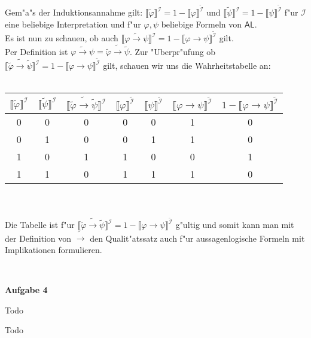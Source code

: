 \documentclass[a4paper,10pt]{article}
\begin{document}
\begin{compactenum} [(a)]
		Gem"a"s der Induktionsannahme gilt: $\llbracket \tilde{\varphi} \rrbracket^\mathcal{I} = 1 - \llbracket \varphi \rrbracket^{\tilde{\mathcal{I}}}$ und $\llbracket \tilde{\psi} \rrbracket^\mathcal{I} = 1 - \llbracket \psi \rrbracket^{\tilde{\mathcal{I}}}$ f"ur $\mathcal{I}$ eine beliebige Interpretation und f"ur $\varphi, \psi$ beliebige Formeln von $\mathsf{AL}$.\\
		Es ist nun zu schauen, ob auch $\llbracket \widetilde{\varphi \rightarrow \psi} \rrbracket^\mathcal{I} = 1 - \llbracket \varphi \rightarrow \psi \rrbracket^{\tilde{\mathcal{I}}}$ gilt.\\
		Per Definition ist $\widetilde{\varphi \rightarrow \psi} = \tilde{\varphi} \tilde{\rightarrow} \tilde{\psi}$. Zur "Uberpr"ufung ob $\llbracket \tilde{\varphi} \tilde{\rightarrow} \tilde{\psi} \rrbracket^{\mathcal{I}} = 1 - \llbracket \varphi \rightarrow \psi \rrbracket^{\tilde{\mathcal{I}}}$ gilt, schauen wir uns die Wahrheitstabelle an:\\\\
		\begin{tabular}{c|c|c||c|c|c|c}
			$\llbracket \tilde{\varphi} \rrbracket^{\mathcal{I}}$ & $\llbracket \tilde{\psi} \rrbracket^{\mathcal{I}}$ & $\llbracket \tilde{\varphi} \tilde{\rightarrow} \tilde{\psi} \rrbracket^{\mathcal{I}}$ &  $\llbracket \varphi \rrbracket^{\tilde{\mathcal{I}}}$ & $\llbracket \psi \rrbracket^{\tilde{\mathcal{I}}}$ & $\llbracket \varphi \rightarrow \psi \rrbracket^{\tilde{\mathcal{I}}}$ & $1 - \llbracket \varphi \rightarrow \psi \rrbracket^{\tilde{\mathcal{I}}}$ \\ 
			\hline 
			0 & 0 & 0 & 0 & 0 & 1 & 0 \\ 
			0 & 1 & 0 & 0 & 1 & 1 & 0 \\ 
			1 & 0 & 1 & 1 & 0 & 0 & 1 \\ 
			1 & 1 & 0 & 1 & 1 & 1 & 0 \\ 
		\end{tabular} \ \\\\
		Die Tabelle ist f"ur $\llbracket \tilde{\varphi} \tilde{\rightarrow} \tilde{\psi} \rrbracket^{\mathcal{I}} = 1 - \llbracket \varphi \rightarrow \psi \rrbracket^{\tilde{\mathcal{I}}}$ g"ultig und somit kann man mit der Definition von $\tilde{\rightarrow}$ den Qualit"atssatz auch f"ur aussagenlogische Formeln mit Implikationen formulieren.
	\end{compactenum}\
	
	\textbf{Aufgabe 4}
	\begin{compactenum} [(a)]
		\item Todo
		
		\item Todo
	\end{compactenum}
\end{document}
